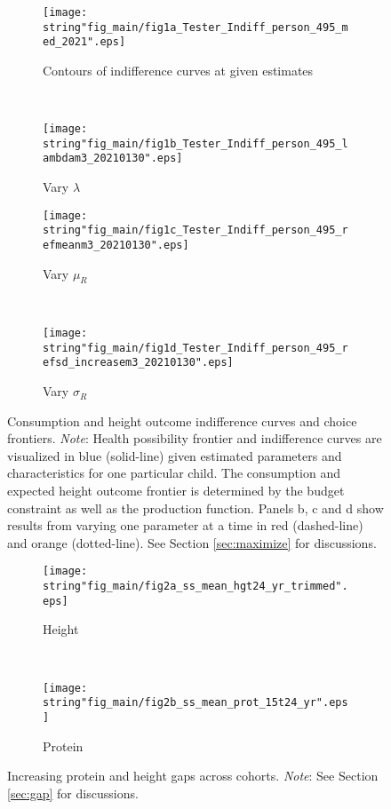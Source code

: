 
\newcommand{\subFigWidth}{0.50}
\begin{figure}[H]
    \centering
    \begin{subfigure}[b]{\subFigWidth\textwidth}
        \centering
        \texttt{[image: \\string"fig\_main/fig1a\_Tester\_Indiff\_person\_495\_med\_2021".eps]}
        \caption{Contours of indifference curves at given estimates}
    \end{subfigure}~
	\begin{subfigure}[b]{\subFigWidth\textwidth}
	    \centering
    	\texttt{[image: \\string"fig\_main/fig1b\_Tester\_Indiff\_person\_495\_lambdam3\_20210130".eps]}
    	\caption{Vary $\lambda$}
	\end{subfigure}
	\par\medskip
	\begin{subfigure}[b]{\subFigWidth\textwidth}
        \centering
        \texttt{[image: \\string"fig\_main/fig1c\_Tester\_Indiff\_person\_495\_refmeanm3\_20210130".eps]}
        \caption{Vary $\mu_{R}$}
    \end{subfigure}~
	\begin{subfigure}[b]{\subFigWidth\textwidth}
	    \centering
	    \texttt{[image: \\string"fig\_main/fig1d\_Tester\_Indiff\_person\_495\_refsd\_increasem3\_20210130".eps]}
	    \caption{Vary $\sigma_{R}$}
	\end{subfigure}
	\caption{Consumption and height outcome indifference curves and choice frontiers. \emph{Note}: Health possibility frontier and indifference curves are visualized in blue (solid-line) given estimated parameters and characteristics for one particular child. The consumption and expected height outcome frontier is determined by the budget constraint as well as the production function. Panels b, c and d show results from varying one parameter at a time in red (dashed-line) and orange (dotted-line). See Section \ref{sec:maximize} for discussions.}
	\label{fig:indiff}
\end{figure}
\pagebreak

\begin{figure}[H]
    \centering
    \begin{subfigure}[t]{.43\textwidth}
        \centering
        \texttt{[image: \\string"fig\_main/fig2a\_ss\_mean\_hgt24\_yr\_trimmed".eps]}
        \caption{Height}
    \end{subfigure}~
	\begin{subfigure}[t]{0.57\textwidth}
	    \centering
    	\texttt{[image: \\string"fig\_main/fig2b\_ss\_mean\_prot\_15t24\_yr".eps]}
    	\caption{Protein}
	\end{subfigure}
	\caption{Increasing protein and height gaps across cohorts. \emph{Note}: See Section \ref{sec:gap} for discussions.}
	\label{fig:PortHgtGap}
\end{figure}
\pagebreak

